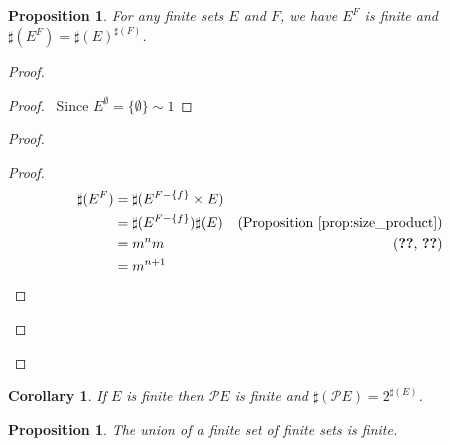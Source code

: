 \documentclass{report}
\let\qed\relax
\newtheorem{prop}[ax]{Proposition}
\newtheorem{cor}{Corollary}[ax]
\theoremstyle{definition}
\begin{document}
\begin{prop}
For any finite sets $E$ and $F$, we have $E^F$ is finite and $\sharp(E^F) = \sharp(E)^{\sharp(F)}$.
\end{prop}

\begin{proof}
\pf
{}
\begin{proof}
	\pf\ Since $E^\emptyset = \{\emptyset\} \sim 1$
\end{proof}
\begin{proof}
	\begin{proof}
		\pf
		\begin{align*}
			\sharp(E^F) & = \sharp(E^{F - \{f\}} \times E) \\
			& = \sharp(E^{F - \{f\}}) \sharp(E) & (\text{Proposition \ref{prop:size_product}}) \\
			& = m^n m & (\text{\stepref{b}, \stepref{d}}) \\
			& = m^{n+1}
		\end{align*}
	\end{proof}
\end{proof}
\qed
\end{proof}

\begin{cor}
If $E$ is finite then $\mathcal{P} E$ is finite and $\sharp(\mathcal{P} E) = 2^{\sharp(E)}$.
\end{cor}

\begin{prop}
The union of a finite set of finite sets is finite.
\end{prop}
\end{document}
